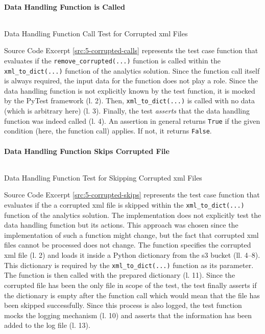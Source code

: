 \paragraph{Data Handling Function is Called}
\begin{listing}[h!]
	\inputminted{python}{main-matter/src/5-corrupted-calls.py}
	\caption{Data Handling Function Call Test for Corrupted \ac{xml} Files}
	\label{src:5-corrupted-calls}
\end{listing}
Source Code Excerpt \ref{src:5-corrupted-calls} represents the test case function that evaluates if the \texttt{remove\_corrupted(...)} function is called within the \texttt{xml\_to\_dict(...)} function of the analytics solution. Since the function call itself is always required, the input data for the function does not play a role. Since the data handling function is not explicitly known by the test function, it is mocked by the PyTest framework (l. 2). Then, \texttt{xml\_to\_dict(...)} is called with no data (which is arbitrary here) (l. 3). Finally, the test \textit{asserts} that the data handling function was indeed called (l. 4). An assertion in general returns \texttt{True} if the given condition (here, the function call) applies. If not, it returns \texttt{False}. 
\newpage

\paragraph{Data Handling Function Skips Corrupted File}
\begin{listing}[h!]
	\inputminted{python}{main-matter/src/5-corrupted-skips.py}
	\caption{Data Handling Function Test for Skipping Corrupted \ac{xml} Files}
	\label{src:5-corrupted-skips}
\end{listing}
Source Code Excerpt \ref{src:5-corrupted-skips} represents the test case function that evaluates if the a corrupted \ac{xml} file is skipped within the \texttt{xml\_to\_dict(...)} function of the analytics solution. The implementation does not explicitly test the data handling function but its actions. This approach was chosen since the implementation of such a function might change, but the fact that corrupted \ac{xml} files cannot be processed does not change. The function specifies the corrupted \ac{xml} file (l. 2) and loads it inside a Python dictionary from the \ac{s3} bucket (ll. 4--8). This dictionary is required by the \texttt{xml\_to\_dict(...)} function as its parameter. The function is then called with the prepared dictionary (l. 11). Since the corrupted file has been the only file in scope of the test, the test finally asserts if the dictionary is empty after the function call which would mean that the file has been skipped successfully. Since this process is also logged, the test function mocks the logging mechanism (l. 10) and asserts that the information has been added to the log file (l. 13). 
\newpage
